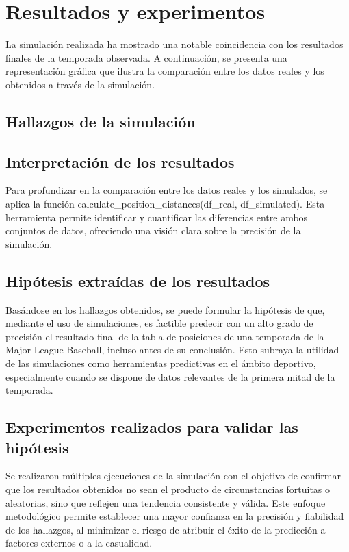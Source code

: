 \documentclass{article}
\begin{document}
    \section{Resultados y experimentos}
        La simulación realizada ha mostrado una notable coincidencia con los resultados finales de la temporada observada. A continuación, se presenta una representación gráfica que ilustra la comparación entre los datos reales y los obtenidos a través de la simulación.

        \subsection{Hallazgos de la simulación}

        \subsection{Interpretación de los resultados}
            Para profundizar en la comparación entre los datos reales y los simulados, se aplica la función calculate\_position\_distances(df\_real, df\_simulated). Esta herramienta permite identificar y cuantificar las diferencias entre ambos conjuntos de datos, ofreciendo una visión clara sobre la precisión de la simulación.

        \subsection{Hipótesis extraídas de los resultados}
            Basándose en los hallazgos obtenidos, se puede formular la hipótesis de que, mediante el uso de simulaciones, es factible predecir con un alto grado de precisión el resultado final de la tabla de posiciones de una temporada de la Major League Baseball, incluso antes de su conclusión. Esto subraya la utilidad de las simulaciones como herramientas predictivas en el ámbito deportivo, especialmente cuando se dispone de datos relevantes de la primera mitad de la temporada.

        \subsection{Experimentos realizados para validar las hipótesis}
            Se realizaron múltiples ejecuciones de la simulación con el objetivo de confirmar que los resultados obtenidos no sean el producto de circunstancias fortuitas o aleatorias, sino que reflejen una tendencia consistente y válida. Este enfoque metodológico permite establecer una mayor confianza en la precisión y fiabilidad de los hallazgos, al minimizar el riesgo de atribuir el éxito de la predicción a factores externos o a la casualidad.
\end{document}
